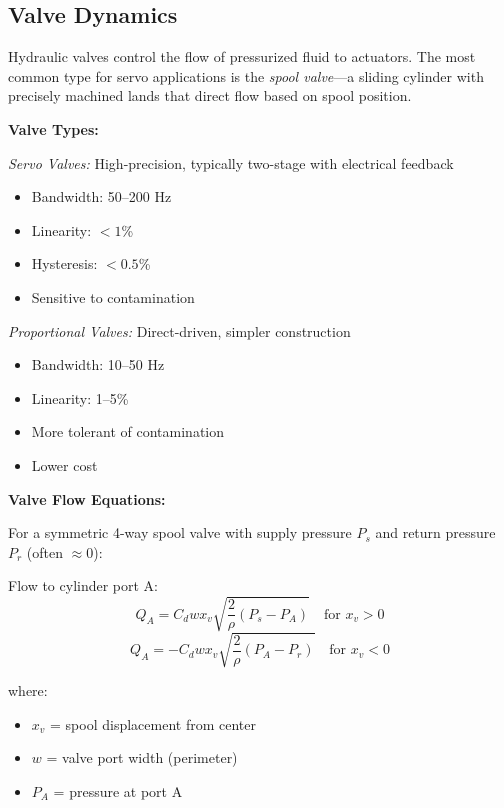 \subsection{Valve Dynamics}

Hydraulic valves control the flow of pressurized fluid to actuators. The most common type for servo applications is the \textit{spool valve}---a sliding cylinder with precisely machined lands that direct flow based on spool position.

\textbf{Valve Types:}

\textit{Servo Valves:} High-precision, typically two-stage with electrical feedback
\begin{itemize}
    \item Bandwidth: 50--200 Hz
    \item Linearity: $< 1$\%
    \item Hysteresis: $< 0.5$\%
    \item Sensitive to contamination
\end{itemize}

\textit{Proportional Valves:} Direct-driven, simpler construction
\begin{itemize}
    \item Bandwidth: 10--50 Hz
    \item Linearity: 1--5\%
    \item More tolerant of contamination
    \item Lower cost
\end{itemize}

\textbf{Valve Flow Equations:}

For a symmetric 4-way spool valve with supply pressure $P_s$ and return pressure $P_r$ (often $\approx 0$):

Flow to cylinder port A:
\begin{equation}
    Q_A = C_d w x_v \sqrt{\frac{2}{\rho}(P_s - P_A)} \quad \text{for } x_v > 0
\end{equation}
\begin{equation}
    Q_A = -C_d w x_v \sqrt{\frac{2}{\rho}(P_A - P_r)} \quad \text{for } x_v < 0
\end{equation}

where:
\begin{itemize}
    \item $x_v$ = spool displacement from center
    \item $w$ = valve port width (perimeter)
    \item $P_A$ = pressure at port A
\end{itemize}


